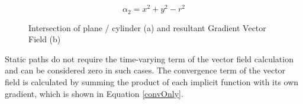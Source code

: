 \documentclass[numbered,pdftex]{ohio-etd}
\begin{document}
\begin{equation}
\label{cylinder}
\alpha_2 = x^2+y^2-r^2
\end{equation}

\begin{figure}[H]
	\begin{subfigmatrix}{2}%
		\centering	
		\hspace*{0mm}
	\end{subfigmatrix}
	\caption{Intersection of plane / cylinder (a) and resultant Gradient Vector Field (b)}
	\label{fig:gvfCircPrimitive}
\end{figure}

Static paths do not require the time-varying term of the vector field calculation and can be considered zero in such cases. The convergence term of the vector field is calculated by summing the product of each implicit function with its own gradient, which is shown in Equation \ref{convOnly}.
\end{document}
